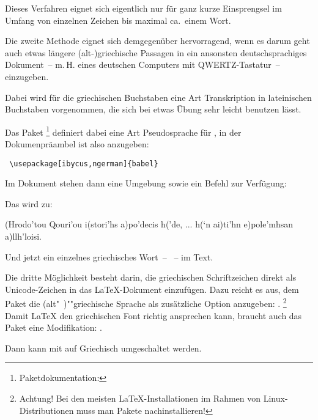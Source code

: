 Dieses Verfahren eignet sich eigentlich nur für ganz kurze Einsprengsel im Umfang von
einzelnen Zeichen bis maximal ca.\ einem Wort.



Die zweite Methode eignet sich demgegenüber hervorragend, wenn es darum geht auch etwas
längere (alt-)griechische Passagen in ein ansonsten deutschsprachiges Dokument~-- m.\,H. eines
deutschen Computers mit QWERTZ-Tastatur~-- einzugeben.

Dabei wird für die griechischen Buchstaben eine Art Transkription in lateinischen Buchstaben
vorgenommen, die sich bei etwas Übung sehr leicht benutzen lässt.

Das Paket %
\footnote{Paketdokumentation: }
definiert dabei eine Art Pseudosprache für ,
in der Dokumenpräambel ist also anzugeben:

\begin{lstlisting}
 \usepackage[ibycus,ngerman]{babel}
\end{lstlisting}

Im Dokument stehen dann eine Umgebung  sowie ein Befehl 
zur Verfügung:


Das wird zu:

 \begin{ibycus}
  (Hrodo'tou Qouri’ou i(stori’hs a)po’decis h(’de,
  ...
  h(‘n ai)ti’hn e)pole’mhsan a)llh’loisi.
  \end{ibycus}

  Und jetzt ein einzelnes griechisches Wort~-- ~-- im Text.






Die dritte Möglichkeit besteht darin, die griechischen Schriftzeichen direkt als Unicode-Zeichen
in das \LaTeX -Dokument einzufügen. Dazu reicht es aus, dem Paket  die
(alt"~)""griechische Sprache als zusätzliche Option anzugeben:
.
\footnote{Achtung! Bei den meisten \LaTeX-Installationen im Rahmen von Linux-Distributionen muss
man Pakete nachinstallieren!}
Damit \LaTeX{} den griechischen Font richtig ansprechen kann, braucht auch das Paket 
eine Modifikation: .

Dann kann mit  auf Griechisch umgeschaltet werden.


